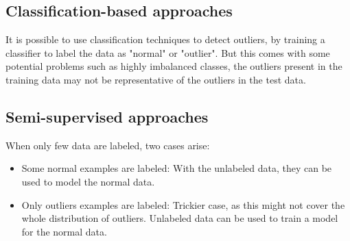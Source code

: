 \documentclass[12pt, openany]{report}
\theoremstyle{definition}
\begin{document}
\subsection{Classification-based approaches}
It is possible to use classification techniques to detect outliers, by training a classifier to label the data as "normal" or "outlier". But this comes with some potential problems such as highly imbalanced classes, the outliers present in the training data may not be representative of the outliers in the test data.
\subsection{Semi-supervised approaches}
When only few data are labeled, two cases arise:
\begin{itemize}
    \item Some normal examples are labeled: With the unlabeled data, they can be used to model the normal data.
    \item Only outliers examples are labeled: Trickier case, as this might not cover the whole distribution of outliers. Unlabeled data can be used to train a model for the normal data.
\end{itemize}
\end{document}
